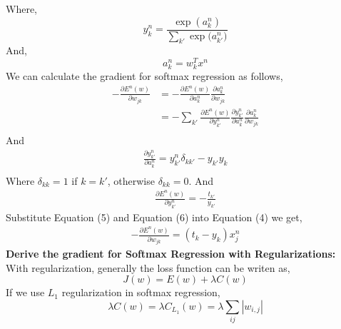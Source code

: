 \documentclass{article} %
\begin{document}
Where, 
\begin{equation}
	y_k^n = \frac{\exp{(a_k^n)}}{ \sum_{k'}\exp{(a_{k'}^n})}
\end{equation}
And, 
\begin{equation}
	a_k^n = w_k^Tx^n
\end{equation}
We can calculate the gradient for softmax regression as follows,
\begin{equation}
\begin{split}
-\frac{\partial E^n(w)}{\partial w_{jk}}& = - \frac{\partial E^n(w)}{\partial a_k^n}\frac{\partial a_k^n}{\partial w_{jk}} \\
& = -\sum_{k'} \frac{\partial E^n(w)}{\partial y^n_{k'}} \frac{\partial y^n_{k'}}{\partial a^n_k}\frac{\partial a_k^n}{\partial w_{jk}} \\
\end{split}
\end{equation}
And 
\begin{equation}
\begin{split}
\frac{\partial y^n_{k'}}{\partial a^n_k} =  y^n_{k'}\delta_{kk'} - y_{k
'}y_{k}\\
\end{split}
\end{equation}
Where $\delta_{kk} = 1$ if $k = k'$, otherwise $\delta_{kk} = 0$.
And
\begin{equation}
\begin{split}
	\frac{\partial E^n(w)}{\partial y^n_{k'}} = -\frac{t_{k'}}{y_{k'}}
\end{split}
\end{equation}
Substitute Equation (5) and Equation (6) into Equation (4) we get,
\begin{equation}
\begin{split}
	-\frac{\partial E^n(w)}{\partial w_{jk}} = (t_k - y_k)x_j^n 
\end{split}
\end{equation}
\textbf{Derive the gradient for Softmax Regression with Regularizations:} \\

With regularization, generally the loss function can be writen as,
\begin{equation}
J(w) = E(w) + \lambda C(w)
\end{equation}
If we use $L_1$ regularization in softmax regression,
\begin{equation}
	\lambda C(w) = \lambda C_{L_1}(w) =   \lambda \sum_{ij}|w_{i,j}|
\end{equation}
\end{document}
